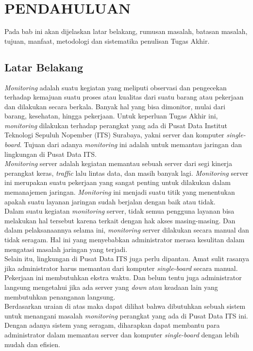\chapter{PENDAHULUAN}
\tab Pada bab ini akan dijelaskan latar belakang, rumusan masalah, batasan masalah, tujuan, manfaat, metodologi dan sistematika penulisan Tugas Akhir.

\section{Latar Belakang}
\tab \textit{Monitoring} adalah suatu kegiatan yang meliputi observasi dan pengecekan terhadap kemajuan suatu proses atau kualitas dari suatu barang atau pekerjaan dan dilakukan secara berkala. Banyak hal yang bisa dimonitor, mulai dari barang, kesehatan, hingga pekerjaan. Untuk keperluan Tugas Akhir ini, \textit{monitoring} dilakukan terhadap perangkat yang ada di Pusat Data Institut Teknologi Sepuluh Nopember (ITS) Surabaya, yakni server dan komputer \textit{single-board}. Tujuan dari adanya \textit{monitoring} ini adalah untuk memantau jaringan dan lingkungan di Pusat Data ITS.\\
\tab \textit{Monitoring} server adalah kegiatan memantau sebuah server dari segi kinerja perangkat keras, \textit{traffic} lalu lintas data, dan masih banyak lagi. \textit{Monitoring} server ini merupakan suatu pekerjaan yang sangat penting untuk dilakukan dalam memanajemen jaringan. \textit{Monitoring} ini menjadi suatu titik yang menentukan apakah suatu layanan jaringan sudah berjalan dengan baik atau tidak.\\
\tab Dalam suatu kegiatan \textit{monitoring} server, tidak semua pengguna layanan bisa melakukan hal tersebut karena terkait dengan hak akses masing-masing. Dan dalam pelaksanaannya selama ini, \textit{monitoring} server dilakukan secara manual dan tidak seragam. Hal ini yang menyebabkan administrator merasa kesulitan dalam mengatasi masalah jaringan yang terjadi.\\
\tab Selain itu, lingkungan di Pusat Data ITS juga perlu dipantau. Amat sulit rasanya jika administrator harus memantau dari komputer \textit{single-board} secara manual. Pekerjaan ini membutuhkan ekstra waktu. Dan belum tentu juga administrator langsung mengetahui jika ada server yang \textit{down} atau keadaan lain yang membutuhkan penanganan langsung.\\
\tab Berdasarkan uraian di atas maka dapat dilihat bahwa dibutuhkan sebuah sistem untuk menangani masalah \textit{monitoring} perangkat yang ada di Pusat Data ITS ini. Dengan adanya sistem yang seragam, diharapkan dapat membantu para administrator dalam memantau server dan komputer \textit{single-board} dengan lebih mudah dan efisien.


